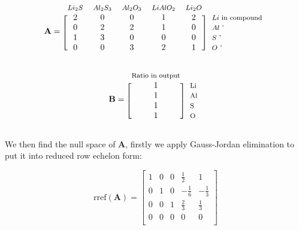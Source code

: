 \documentclass[a4paper, 12pt]{article}
\begin{document}
\begin{minipage}{0.6\textwidth}
	\begin{equation*}
	\mathbf{A}=
	\begin{blockarray}{*{5}{c} l}
	\begin{block}{*{5}{>{$\footnotesize}c<{$}} l}
	$Li_2S$ & $Al_2S_3$ & $Al_2O_3$ & $LiAlO_2$ & $Li_2O$ \\
	\end{block}
	\begin{block}{[*{5}{c}]>{$\footnotesize}l<{$}}
	2 & 0 & 0 & 1 & 2 & $Li$ in compound\\
	0 & 2 & 2 & 1 & 0 & $Al$ ' \\
	1 & 3 & 0 & 0 & 0 & $S$ ' \\
	0 & 0 & 3 & 2 & 1 & $O$ ' \\
	\end{block}
	\end{blockarray}
	\end{equation*}	
\end{minipage}
\begin{minipage}{0.4\textwidth}
	\begin{equation*}
	\mathbf{B}=
	\begin{blockarray}{*{1}{c} l}
	\begin{block}{*{1}{>{$\footnotesize}c<{$}} l}
	Ratio in output \\
	\end{block}
	\begin{block}{[*{1}{c}]>{$\footnotesize}l<{$}}
	1 & Li \\
	1 & Al \\
	1 & S \\
	1 & O \\
	\end{block}
	\end{blockarray}
	\end{equation*}
\end{minipage}

\pagebreak

We then find the null space of $\mathbf{A}$, firstly we apply Gauss-Jordan elimination to put it into reduced row echelon form: 

\begin{equation*}
	\text{rref}(\mathbf{A})=
	\begin{bmatrix}
	1 & 0 & 0 & \frac{1}{2} & 1 \\
	0 & 1 & 0 & -\frac{1}{6} & -\frac{1}{3} \\
	0 & 0 & 1 & \frac{2}{3} & \frac{1}{3} \\
	0 & 0 & 0 & 0 & 0 \\
	\end{bmatrix}
\end{equation*}
\end{document}
